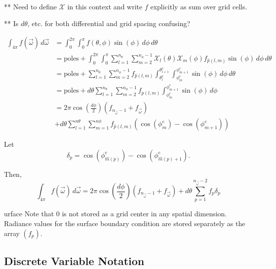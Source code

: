 ** Need to define $\mathcal{X}$ in this context and write $f$ explicitly as sum
over grid cells.

** Is $d\theta$, etc. for both differential and grid spacing confusing?

\begin{align}
  \int_{4\pi} f(\vec{\omega})\,d\vec{\omega} &= \int_0^{2\pi} \int_0^{\pi} f(\theta, \phi) \sin(\phi)\, d\phi\, d\theta \\
                                             &= \mbox{poles} + \int_0^{2\pi}\int_0^{\pi} \sum_{l=1}^{n_\theta}\sum_{m=2}^{n_\phi-1}\mathcal{X}_l(\theta) \mathcal{X}_m(\phi) f_{\hat{p}(l,m)} \sin(\phi)\, d\phi\, d\theta \\
                                             &= \mbox{poles} + \sum_{l=1}^{n_\theta}\sum_{m=2}^{n_\phi-1}f_{\hat{p}(l,m)}\int_{\theta_l^e}^{\theta_{l+1}^e}\int_{\phi_m^e}^{\phi_{m+1}^e} \sin(\phi)\, d\phi\, d\theta \\
                                             &= \mbox{poles} + d\theta\sum_{l=1}^{n_\theta}\sum_{m=2}^{n_\phi-1} f_{\hat{p}(l,m)}\int_{\phi_m^e}^{\phi_{m+1}^e} \sin(\phi)\, d\phi \\
                                             &= 2\pi\cos(\frac{d\phi}{2})\left( f_{n_{\vec{\omega}}-1}+f_{\vec{\omega}}\right) \\&+ d\theta\sum_{l=1}^{n\theta}\sum_{m=1}^{n\phi} f_{\hat{p}(l,m)}\left( \cos(\phi_m^e)-\cos(\phi_{m+1}^e) \right) \nonumber
\end{align}

Let
\begin{equation}
  \delta_p = \cos(\phi_{\hat{m}(p)}^e)-\cos(\phi_{\hat{m}(p)+1}^e).
\end{equation}

Then,
\begin{equation}
  \int_{4\pi} f(\vec{\omega})\,d\vec{\omega} = 2\pi\cos(\frac{d\phi}{2})\left( f_{n_{\vec{\omega}}-1}+f_{\vec{\omega}}\right) + d\theta\sum_{p=1}^{n_{\vec{\omega}}-2} f_p\delta_p
 \end{equation}


 urface
Note that $0$ is not stored as a grid center in any spatial dimension.
Radiance values for the surface boundary condition are stored
separately as the array $(f_p)$.

\subsection{Discrete Variable Notation}

